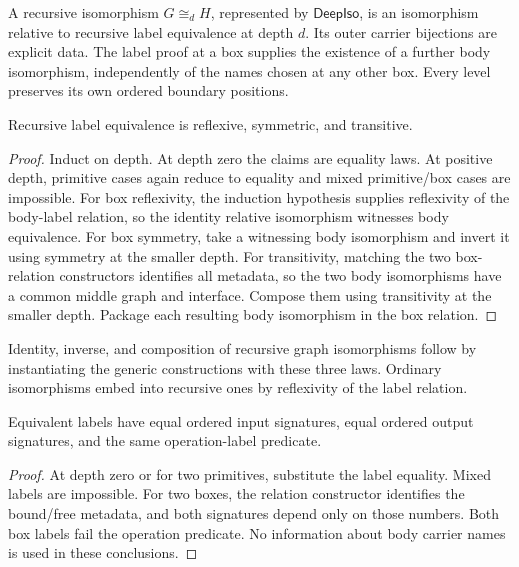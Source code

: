 \begin{definition}\label{term:deep-isomorphism}
A recursive isomorphism $G\cong_d H$, represented by $\mathsf{DeepIso}$, is an
isomorphism relative to recursive label equivalence at depth $d$. Its outer
carrier bijections are explicit data. The label proof at a box supplies the
existence of a further body isomorphism, independently of the names chosen at
any other box. Every level preserves its own ordered boundary positions.
\end{definition}

\begin{lemma}
Recursive label equivalence is reflexive, symmetric, and transitive.
\end{lemma}
\begin{proof}
Induct on depth. At depth zero the claims are equality laws. At positive depth,
primitive cases again reduce to equality and mixed primitive/box cases are
impossible. For box reflexivity, the induction hypothesis supplies reflexivity
of the body-label relation, so the identity relative isomorphism witnesses body
equivalence. For box symmetry, take a witnessing body isomorphism and invert it
using symmetry at the smaller depth. For transitivity, matching the two
box-relation constructors identifies all metadata, so the two body isomorphisms
have a common middle graph and interface. Compose them using transitivity at
the smaller depth. Package each resulting body isomorphism in the box relation.
\end{proof}
Identity, inverse, and composition of recursive graph isomorphisms follow by
instantiating the generic constructions with these three laws. Ordinary
isomorphisms embed into recursive ones by reflexivity of the label relation.

\begin{lemma}
Equivalent labels have equal ordered input signatures, equal ordered output
signatures, and the same operation-label predicate.
\end{lemma}
\begin{proof}
At depth zero or for two primitives, substitute the label equality. Mixed
labels are impossible. For two boxes, the relation constructor identifies the
bound/free metadata, and both signatures depend only on those numbers. Both
box labels fail the operation predicate. No information about body carrier
names is used in these conclusions.
\end{proof}

